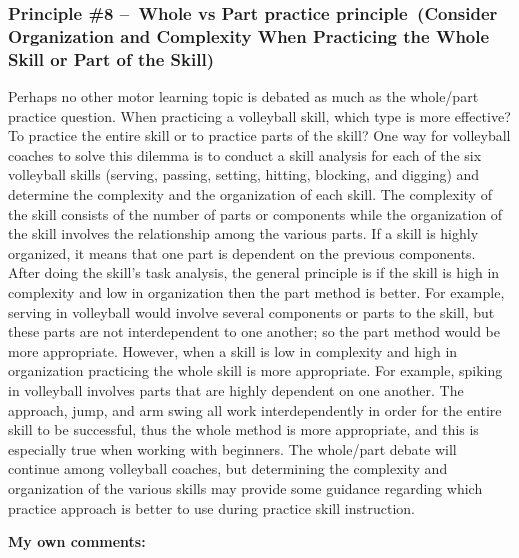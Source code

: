 \documentclass[
  letterpaper,
  DIV=11,
  numbers=noendperiod]{scrartcl}
\begin{document}
\hypertarget{principle-8-whole-vs-part-practice-principle-consider-organization-and-complexity-when-practicing-the-whole-skill-or-part-of-the-skill}{%
\subsubsection{\texorpdfstring{\textbf{Principle \#8 --~Whole vs Part
practice principle~(Consider Organization and Complexity When Practicing
the Whole Skill or Part of the
Skill)}}{Principle \#8 --~Whole vs Part practice principle~(Consider Organization and Complexity When Practicing the Whole Skill or Part of the Skill)}}\label{principle-8-whole-vs-part-practice-principle-consider-organization-and-complexity-when-practicing-the-whole-skill-or-part-of-the-skill}}

Perhaps no other motor learning topic is debated as much as the
whole/part practice question. When practicing a volleyball skill, which
type is more effective? To practice the entire skill or to practice
parts of the skill? One way for volleyball coaches to solve this dilemma
is to conduct a skill analysis for each of the six volleyball skills
(serving, passing, setting, hitting, blocking, and digging) and
determine the complexity and the organization of each skill. The
complexity of the skill consists of the number of parts or components
while the organization of the skill involves the relationship among the
various parts. If a skill is highly organized, it means that one part is
dependent on the previous components. After doing the skill's task
analysis, the general principle is if the skill is high in complexity
and low in organization then the part method is better. For example,
serving in volleyball would involve several components or parts to the
skill, but these parts are not interdependent to one another; so the
part method would be more appropriate. However, when a skill is low in
complexity and high in organization practicing the whole skill is more
appropriate. For example, spiking in volleyball involves parts that are
highly dependent on one another. The approach, jump, and arm swing all
work interdependently in order for the entire skill to be successful,
thus the whole method is more appropriate, and this is especially true
when working with beginners. The whole/part debate will continue among
volleyball coaches, but determining the complexity and organization of
the various skills may provide some guidance regarding which practice
approach is better to use during practice skill instruction.

\textbf{My own comments:}
\end{document}
